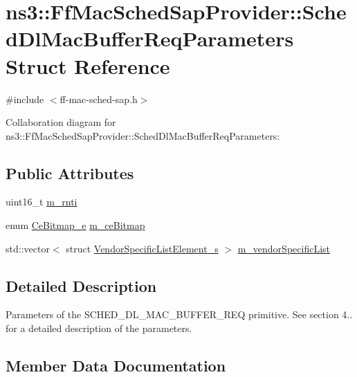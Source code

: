\hypertarget{structns3_1_1FfMacSchedSapProvider_1_1SchedDlMacBufferReqParameters}{}\section{ns3\+:\+:Ff\+Mac\+Sched\+Sap\+Provider\+:\+:Sched\+Dl\+Mac\+Buffer\+Req\+Parameters Struct Reference}
\label{structns3_1_1FfMacSchedSapProvider_1_1SchedDlMacBufferReqParameters}


{\ttfamily \#include $<$ff-\/mac-\/sched-\/sap.\+h$>$}



Collaboration diagram for ns3\+:\+:Ff\+Mac\+Sched\+Sap\+Provider\+:\+:Sched\+Dl\+Mac\+Buffer\+Req\+Parameters\+:
\subsection*{Public Attributes}
\begin{DoxyCompactItemize}
\item 
uint16\+\_\+t \hyperlink{structns3_1_1FfMacSchedSapProvider_1_1SchedDlMacBufferReqParameters_a9eb6c81c13e0cdb4b78714dbae16fd56}{m\+\_\+rnti}
\item 
enum \hyperlink{namespacens3_aac21e8089f0189907f822d63ccdb36ea}{Ce\+Bitmap\+\_\+e} \hyperlink{structns3_1_1FfMacSchedSapProvider_1_1SchedDlMacBufferReqParameters_aaa2420dc6c15845d9e2c527d9cffc368}{m\+\_\+ce\+Bitmap}
\item 
std\+::vector$<$ struct \hyperlink{structns3_1_1VendorSpecificListElement__s}{Vendor\+Specific\+List\+Element\+\_\+s} $>$ \hyperlink{structns3_1_1FfMacSchedSapProvider_1_1SchedDlMacBufferReqParameters_afc1d171431a5b30716fb9de37cfbb10d}{m\+\_\+vendor\+Specific\+List}
\end{DoxyCompactItemize}


\subsection{Detailed Description}
Parameters of the S\+C\+H\+E\+D\+\_\+\+D\+L\+\_\+\+M\+A\+C\+\_\+\+B\+U\+F\+F\+E\+R\+\_\+\+R\+EQ primitive. See section 4.. for a detailed description of the parameters. 

\subsection{Member Data Documentation}
